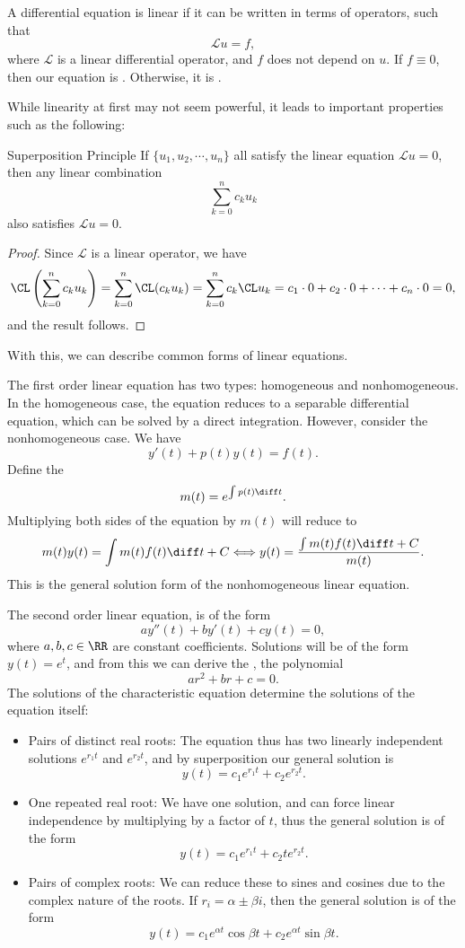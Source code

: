\begin{definition}{}{}
A differential equation is linear if it can be written in terms of operators, such that 
\[ \mathcal{L}u = f, \] where $\mathcal L$ is a linear differential operator, and $f$ does not depend on $u$. If $f \equiv 0$, then our equation is . Otherwise, it is . 
\end{definition}

While linearity at first may not seem powerful, it leads to important properties such as the following: 
\begin{theorem}{Superposition Principle}{}
If $\{u_1, u_2, \cdots, u_n \}$ all satisfy the linear equation $\mathcal{L}u = 0$, then any linear combination 
\[ \sum_{k=0}^n c_ku_k \] also satisfies $\mathcal{L}u = 0$. 
\end{theorem}
\begin{proof}
Since $\mathcal{L}$ is a linear operator, we have 
\[ \CL \left ( \sum_{k=0}^n c_ku_k \right ) = \sum_{k=0}^n \CL(c_ku_k) = \sum_{k=0}^n c_k\CL u_k = c_1 \cdot 0 + c_2 \cdot 0 + \cdots + c_n \cdot 0 = 0, \] and the result follows. 
\end{proof}

With this, we can describe common forms of linear equations.

The first order linear equation has two types: homogeneous and nonhomogeneous. In the homogeneous case, the equation reduces to a separable differential equation, which can be solved by a direct integration. However, consider the nonhomogeneous case. We have 
\[ y'(t) + p(t)y(t) = f(t). \] Define the  
\[ m(t) = e^{\int p(t) \diff t}. \] Multiplying both sides of the equation by $m(t)$ will reduce to 
\[ m(t)y(t) = \int m(t)f(t) \diff t + C \Longleftrightarrow y(t) = \frac{\int m(t)f(t) \diff t + C}{m(t)}. \] This is the general solution form of the nonhomogeneous linear equation. 

The second order linear equation, is of the form 
\[ ay''(t) + by'(t) + cy(t) = 0, \] where $a,b,c \in \RR$ are constant coefficients. Solutions will be of the form $y(t) = e^t$, and from this we can derive the , the polynomial 
\[ ar^2 + br + c = 0. \] The solutions of the characteristic equation determine the solutions of the equation itself: 
\begin{itemize}
\item Pairs of distinct real roots: The equation thus has two linearly independent solutions $e^{r_1t}$ and $e^{r_2t}$, and by superposition our general solution is 
\[ y(t) = c_1e^{r_1t} + c_2e^{r_2 t}. \] 
\item One repeated real root: We have one solution, and can force linear independence by multiplying by a factor of $t$, thus the general solution is of the form 
\[ y(t) = c_1e^{r_1 t} + c_2te^{r_2 t}. \] 
\item Pairs of complex roots: We can reduce these to sines and cosines due to the complex nature of the roots. If $r_i = \alpha \pm \beta i$, then the general solution is of the form 
\[ y(t) = c_1e^{\alpha t}\cos{\beta t} + c_2e^{\alpha t}\sin{\beta t}. \] 
\end{itemize}

